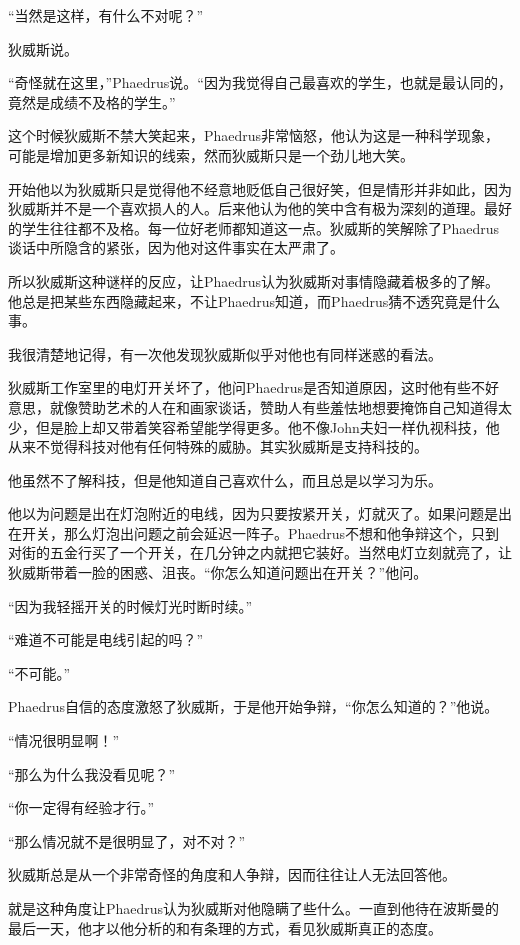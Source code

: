\documentclass[UTF8]{article}
\begin{document}
\par “当然是这样，有什么不对呢？”
\par 狄威斯说。
\par “奇怪就在这里，”Phaedrus说。“因为我觉得自己最喜欢的学生，也就是最认同的，竟然是成绩不及格的学生。”
\par 这个时候狄威斯不禁大笑起来，Phaedrus非常恼怒，他认为这是一种科学现象，可能是增加更多新知识的线索，然而狄威斯只是一个劲儿地大笑。
\par 开始他以为狄威斯只是觉得他不经意地贬低自己很好笑，但是情形并非如此，因为狄威斯并不是一个喜欢损人的人。后来他认为他的笑中含有极为深刻的道理。最好的学生往往都不及格。每一位好老师都知道这一点。狄威斯的笑解除了Phaedrus谈话中所隐含的紧张，因为他对这件事实在太严肃了。
\par 所以狄威斯这种谜样的反应，让Phaedrus认为狄威斯对事情隐藏着极多的了解。他总是把某些东西隐藏起来，不让Phaedrus知道，而Phaedrus猜不透究竟是什么事。
\par 我很清楚地记得，有一次他发现狄威斯似乎对他也有同样迷惑的看法。
\par 狄威斯工作室里的电灯开关坏了，他问Phaedrus是否知道原因，这时他有些不好意思，就像赞助艺术的人在和画家谈话，赞助人有些羞怯地想要掩饰自己知道得太少，但是脸上却又带着笑容希望能学得更多。他不像John夫妇一样仇视科技，他从来不觉得科技对他有任何特殊的威胁。其实狄威斯是支持科技的。
\par 他虽然不了解科技，但是他知道自己喜欢什么，而且总是以学习为乐。
\par 他以为问题是出在灯泡附近的电线，因为只要按紧开关，灯就灭了。如果问题是出在开关，那么灯泡出问题之前会延迟一阵子。Phaedrus不想和他争辩这个，只到对街的五金行买了一个开关，在几分钟之内就把它装好。当然电灯立刻就亮了，让狄威斯带着一脸的困惑、沮丧。“你怎么知道问题出在开关？”他问。
\par “因为我轻摇开关的时候灯光时断时续。”
\par “难道不可能是电线引起的吗？”
\par “不可能。”
\par Phaedrus自信的态度激怒了狄威斯，于是他开始争辩，“你怎么知道的？”他说。
\par “情况很明显啊！”
\par “那么为什么我没看见呢？”
\par “你一定得有经验才行。”
\par “那么情况就不是很明显了，对不对？”
\par 狄威斯总是从一个非常奇怪的角度和人争辩，因而往往让人无法回答他。
\par 就是这种角度让Phaedrus认为狄威斯对他隐瞒了些什么。一直到他待在波斯曼的最后一天，他才以他分析的和有条理的方式，看见狄威斯真正的态度。
\end{document}
